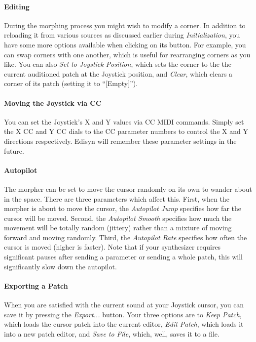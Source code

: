 \documentclass{article}
\begin{document}
\paragraph{Editing} During the morphing process you might wish to modify a corner.  In addition to reloading it from various sources as discussed earlier during {\it Initialization}, you have some more options available when clicking on its button.  For example, you can swap corners with one another, which is useful for rearranging corners as you like.  You can also {\it Set to Joystick Position}, which sets the corner to the the current auditioned patch at the Joystick position, and {\it Clear}, which clears a corner of its patch (setting it to ``[Empty]'').

\paragraph{Moving the Joystick via CC}  You can set the Joystick's X and Y values via CC MIDI commands.  Simply set the X CC and Y CC dials to the CC parameter numbers to control the X and Y directions respectively.  Edisyn will remember these parameter settings in the future.

\paragraph{Autopilot}  The morpher can be set to move the cursor randomly on its own to wander about in the space.   There are three parameters which affect this.  First, when the morpher is about to move the cursor, the {\it Autopilot Jump} specifies how far the cursor will be moved.  Second, the {\it Autopilot Smooth} specifies how much the movement will be totally random (jittery) rather than a mixture of moving forward and moving randomly.  Third, the {\it Autopilot Rate} specifies how often the cursor is moved (higher is faster).  Note that if your synthesizer requires significant pauses after sending a parameter or sending a whole patch, this will significantly slow down the autopilot. 

\paragraph{Exporting a Patch} When you are satisfied with the current sound at your Joystick cursor, you can save it by pressing the {\it Export...} button.  Your three options are to {\it Keep Patch}, which loads the cursor patch into the current editor, {\it Edit Patch}, which loads it into a new patch editor, and {\it Save to File}, which, well, saves it to a file.
\end{document}
